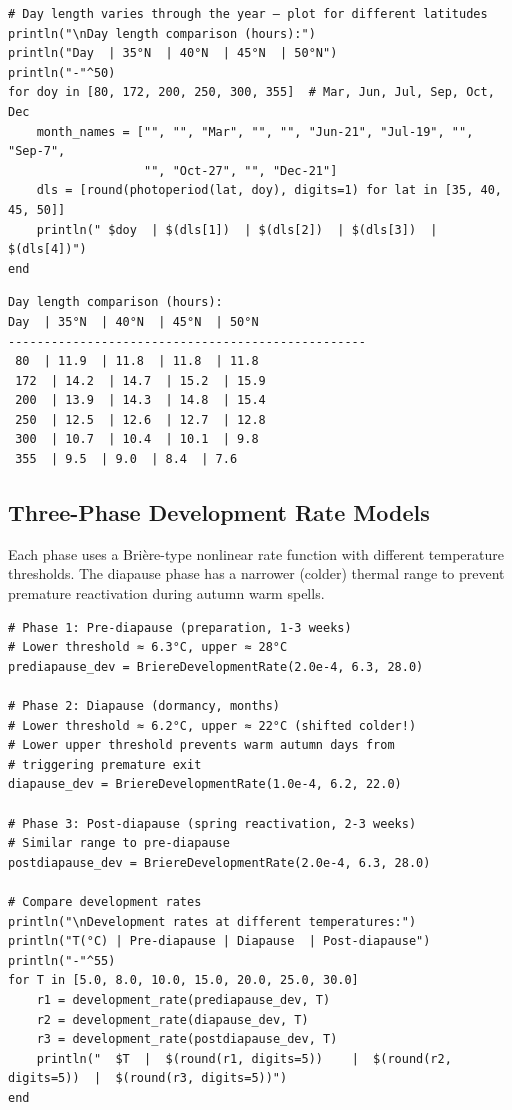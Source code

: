 \begin{verbatim}
# Day length varies through the year — plot for different latitudes
println("\nDay length comparison (hours):")
println("Day  | 35°N  | 40°N  | 45°N  | 50°N")
println("-"^50)
for doy in [80, 172, 200, 250, 300, 355]  # Mar, Jun, Jul, Sep, Oct, Dec
    month_names = ["", "", "Mar", "", "", "Jun-21", "Jul-19", "", "Sep-7",
                   "", "Oct-27", "", "Dec-21"]
    dls = [round(photoperiod(lat, doy), digits=1) for lat in [35, 40, 45, 50]]
    println(" $doy  | $(dls[1])  | $(dls[2])  | $(dls[3])  | $(dls[4])")
end
\end{verbatim}




\begin{verbatim}
Day length comparison (hours):
Day  | 35°N  | 40°N  | 45°N  | 50°N
--------------------------------------------------
 80  | 11.9  | 11.8  | 11.8  | 11.8
 172  | 14.2  | 14.7  | 15.2  | 15.9
 200  | 13.9  | 14.3  | 14.8  | 15.4
 250  | 12.5  | 12.6  | 12.7  | 12.8
 300  | 10.7  | 10.4  | 10.1  | 9.8
 355  | 9.5  | 9.0  | 8.4  | 7.6
\end{verbatim}



\subsection{Three-Phase Development Rate Models}



\label{14867891496030735246}{}


Each phase uses a Brière-type nonlinear rate function with different temperature thresholds. The diapause phase has a narrower (colder) thermal range to prevent premature reactivation during autumn warm spells.




\begin{verbatim}
# Phase 1: Pre-diapause (preparation, 1-3 weeks)
# Lower threshold ≈ 6.3°C, upper ≈ 28°C
prediapause_dev = BriereDevelopmentRate(2.0e-4, 6.3, 28.0)

# Phase 2: Diapause (dormancy, months)
# Lower threshold ≈ 6.2°C, upper ≈ 22°C (shifted colder!)
# Lower upper threshold prevents warm autumn days from
# triggering premature exit
diapause_dev = BriereDevelopmentRate(1.0e-4, 6.2, 22.0)

# Phase 3: Post-diapause (spring reactivation, 2-3 weeks)
# Similar range to pre-diapause
postdiapause_dev = BriereDevelopmentRate(2.0e-4, 6.3, 28.0)

# Compare development rates
println("\nDevelopment rates at different temperatures:")
println("T(°C) | Pre-diapause | Diapause  | Post-diapause")
println("-"^55)
for T in [5.0, 8.0, 10.0, 15.0, 20.0, 25.0, 30.0]
    r1 = development_rate(prediapause_dev, T)
    r2 = development_rate(diapause_dev, T)
    r3 = development_rate(postdiapause_dev, T)
    println("  $T  |  $(round(r1, digits=5))    |  $(round(r2, digits=5))  |  $(round(r3, digits=5))")
end
\end{verbatim}




